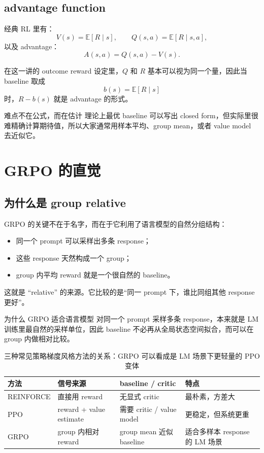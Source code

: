 \documentclass[a4paper]{article}
\begin{document}
\subsection{advantage function}

经典 RL 里有：
\[
V(s) = \mathbb{E}[R \mid s], \qquad Q(s,a)=\mathbb{E}[R \mid s,a],
\]
以及 advantage：
\[
A(s,a)=Q(s,a)-V(s).
\]

在这一讲的 outcome reward 设定里，$Q$ 和 $R$ 基本可以视为同一个量，因此当 baseline 取成
\[
b(s) = \mathbb{E}[R \mid s]
\]
时，$R - b(s)$ 就是 advantage 的形式。

\begin{warningbox}{难点不在公式，而在估计}
理论上最优 baseline 可以写出 closed form，但实际里很难精确计算期待值，所以大家通常用样本平均、group mean，或者 value model 去近似它。
\end{warningbox}


\section{GRPO 的直觉}

\subsection{为什么是 group relative}

GRPO 的关键不在于名字，而在于它利用了语言模型的自然分组结构：
\begin{itemize}
    \item 同一个 prompt 可以采样出多条 response；
    \item 这些 response 天然构成一个 group；
    \item group 内平均 reward 就是一个很自然的 baseline。
\end{itemize}

这就是 “relative” 的来源。它比较的是“同一 prompt 下，谁比同组其他 response 更好”。

\begin{knowledgebox}{为什么 GRPO 适合语言模型}
对同一个 prompt 采样多条 response，本来就是 LM 训练里最自然的采样单位，因此 baseline 不必再从全局状态空间拟合，而可以在 group 内做相对比较。
\end{knowledgebox}

\begin{table}[H]
\centering
\begin{tabular}{@{}p{2.4cm}p{3.8cm}p{3.6cm}p{3.5cm}@{}}
\toprule
\textbf{方法} & \textbf{信号来源} & \textbf{baseline / critic} & \textbf{特点} \\
\midrule
REINFORCE & 直接用 reward & 无显式 critic & 最朴素，方差大 \\
PPO & reward + value estimate & 需要 critic / value model & 更稳定，但系统更重 \\
GRPO & group 内相对 reward & group mean 近似 baseline & 适合多样本 response 的 LM 场景 \\
\bottomrule
\end{tabular}
\caption{三种常见策略梯度风格方法的关系：GRPO 可以看成是 LM 场景下更轻量的 PPO 变体}
\end{table}
\end{document}
